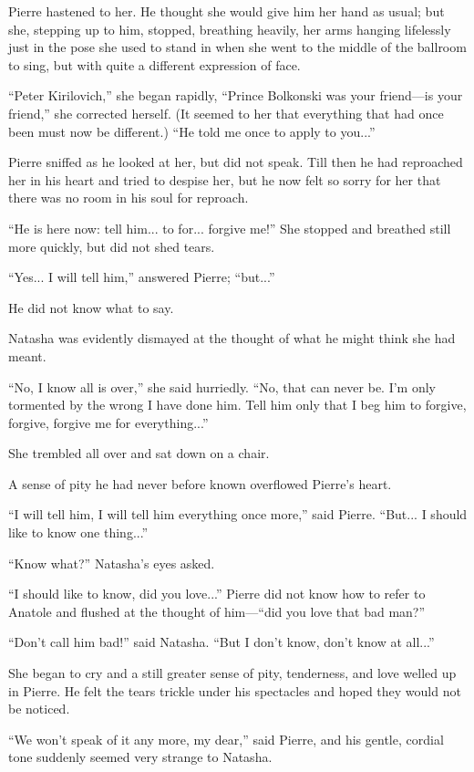 Pierre hastened to her. He thought she would give him her hand as
usual; but she, stepping up to him, stopped, breathing heavily,
her arms hanging lifelessly just in the pose she used to stand in
when she went to the middle of the ballroom to sing, but with
quite a different expression of face.

``Peter Kirilovich,'' she began rapidly, ``Prince Bolkonski was
your friend---is your friend,'' she corrected herself. (It seemed
to her that everything that had once been must now be different.)
``He told me once to apply to you...''

Pierre sniffed as he looked at her, but did not speak. Till then
he had reproached her in his heart and tried to despise her, but
he now felt so sorry for her that there was no room in his soul
for reproach.

``He is here now: tell him... to for... forgive me!'' She stopped
and breathed still more quickly, but did not shed tears.

``Yes... I will tell him,'' answered Pierre; ``but...''

He did not know what to say.

Natasha was evidently dismayed at the thought of what he might
think she had meant.

``No, I know all is over,'' she said hurriedly. ``No, that can
never be.  I'm only tormented by the wrong I have done him. Tell
him only that I beg him to forgive, forgive, forgive me for
everything...''

She trembled all over and sat down on a chair.

A sense of pity he had never before known overflowed Pierre's
heart.

``I will tell him, I will tell him everything once more,'' said
Pierre.  ``But... I should like to know one thing...''

``Know what?'' Natasha's eyes asked.

``I should like to know, did you love...'' Pierre did not know
how to refer to Anatole and flushed at the thought of him---``did
you love that bad man?''

``Don't call him bad!'' said Natasha. ``But I don't know, don't
know at all...''

She began to cry and a still greater sense of pity, tenderness,
and love welled up in Pierre. He felt the tears trickle under his
spectacles and hoped they would not be noticed.

``We won't speak of it any more, my dear,'' said Pierre, and his
gentle, cordial tone suddenly seemed very strange to Natasha.

